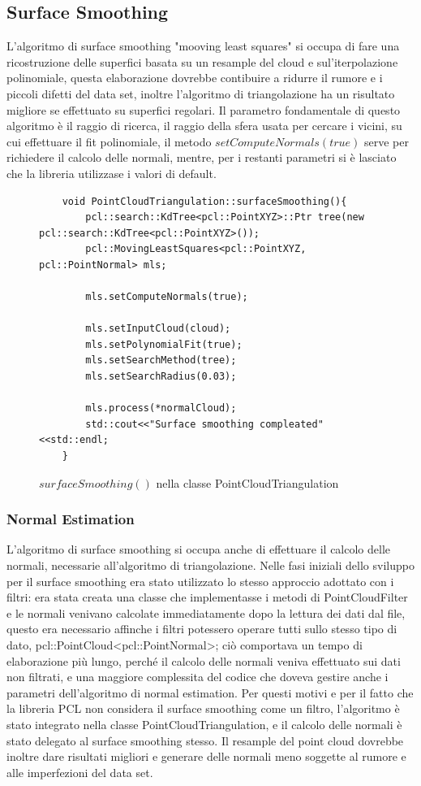\documentclass[a4paper,12pt]{article}
\begin{document}
	\subsection{Surface Smoothing}
	L'algoritmo di surface smoothing "mooving least squares" si occupa di fare una ricostruzione delle superfici basata su 
	un resample del cloud e sul'iterpolazione polinomiale, questa elaborazione dovrebbe contibuire a ridurre il rumore e i
	piccoli difetti del data set, inoltre l'algoritmo di triangolazione ha un risultato migliore se effettuato su superfici
	regolari. Il parametro fondamentale di questo algoritmo è il raggio di ricerca, il raggio della sfera usata per cercare i
	vicini, su cui effettuare il fit polinomiale, il metodo $setComputeNormals(true)$ serve per richiedere il calcolo
	delle normali, mentre, per i restanti parametri si è lasciato che la libreria utilizzase i valori di default.
	\begin{figure}[H]
	\begin{lstlisting}
	void PointCloudTriangulation::surfaceSmoothing(){
    	pcl::search::KdTree<pcl::PointXYZ>::Ptr tree(new pcl::search::KdTree<pcl::PointXYZ>());
    	pcl::MovingLeastSquares<pcl::PointXYZ, pcl::PointNormal> mls;

    	mls.setComputeNormals(true);

    	mls.setInputCloud(cloud);
    	mls.setPolynomialFit(true);
    	mls.setSearchMethod(tree);
    	mls.setSearchRadius(0.03);

    	mls.process(*normalCloud);
    	std::cout<<"Surface smoothing compleated"<<std::endl;
	}
	\end{lstlisting}
	\caption{$surfaceSmoothing()$ nella classe PointCloudTriangulation}
	\label{mls}
	\end{figure}	
	\clearpage 
		\subsubsection{Normal Estimation}
		L'algoritmo di surface smoothing si occupa anche di effettuare il calcolo delle normali, necessarie all'algoritmo di
		triangolazione.
		Nelle fasi iniziali dello sviluppo per il surface smoothing era stato utilizzato lo stesso approccio adottato con i
		filtri: era stata creata una classe che implementasse i metodi di PointCloudFilter e le normali venivano calcolate
		immediatamente dopo la lettura dei dati dal file, questo era necessario affinche i filtri potessero operare tutti 
		sullo stesso tipo di dato, pcl::PointCloud<pcl::PointNormal>; ciò comportava un tempo di elaborazione più lungo,
		perché il calcolo delle normali veniva effettuato sui dati non filtrati, e una maggiore complessita del codice 
		che doveva gestire anche i parametri dell'algoritmo di normal estimation.
		Per questi motivi e per il fatto che la libreria PCL non considera il surface smoothing come un filtro,
		l'algoritmo è stato integrato nella classe PointCloudTriangulation, e il calcolo delle normali è stato delegato
		al surface smoothing stesso.
		Il resample del point cloud dovrebbe inoltre dare risultati migliori e generare delle normali meno soggette 
		al rumore e alle imperfezioni del data set.
	\clearpage
\end{document}
